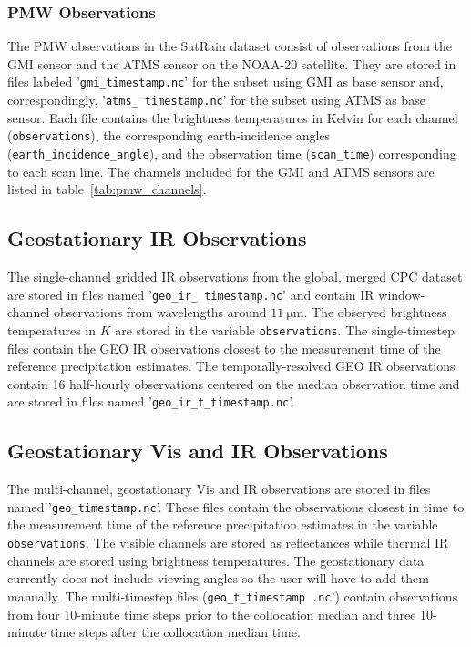 \documentclass[11pt]{article}
\begin{document}
\subsubsection{PMW Observations}

The PMW observations in the SatRain dataset consist of observations from the GMI
sensor and the ATMS sensor on the NOAA-20 satellite. They are stored in files
labeled '\texttt{gmi\_\textlangle timestamp\textrangle.nc}' for the subset using
GMI as base sensor and, correspondingly, '\texttt{atms\_\textlangle
	timestamp\textrangle.nc}' for the subset using ATMS as base sensor. Each file
contains the brightness temperatures in Kelvin for each channel (\texttt{observations}), the
corresponding earth-incidence angles (\texttt{earth\_incidence\_angle}), and the observation time (\texttt{scan\_time}) corresponding to
each scan line. The channels included for the GMI and ATMS sensors are listed in
table~\ref{tab:pmw_channels}.

\subsection{Geostationary IR Observations}

The single-channel gridded IR observations from the global, merged CPC dataset
\citep{NCEP_CPC_L3_IR} are stored in files named '\texttt{geo\_ir\_\textlangle
	timestamp\textrangle.nc}' and contain IR window-channel observations from
wavelengths around $\SI{11}{\micro \meter}$. The observed brightness
temperatures in $\si{K}$ are stored in the variable \texttt{observations}. The
single-timestep files contain the GEO IR observations closest to the
measurement time of the reference precipitation estimates. The
temporally-resolved GEO IR observations contain 16 half-hourly observations
centered on the median observation time and are stored in files named
'\texttt{geo\_ir\_t\_\textlangle timestamp\textrangle.nc}'.

\subsection{Geostationary Vis and IR Observations}

The multi-channel, geostationary Vis and IR observations are stored in files
named '\texttt{geo\_\textlangle timestamp\textrangle.nc}'. These files contain
the observations closest in time to the measurement time of the reference
precipitation estimates in the variable \texttt{observations}. The visible
channels are stored as reflectances while thermal IR channels are stored using
brightness temperatures. The geostationary data currently does not include
viewing angles so the user will have to add them manually. The multi-timestep
files (\texttt{geo\_t\_\textlangle timestamp \textrangle.nc}') contain
observations from four 10-minute time steps prior to the collocation median
and three 10-minute time steps after the collocation median time.
\end{document}
